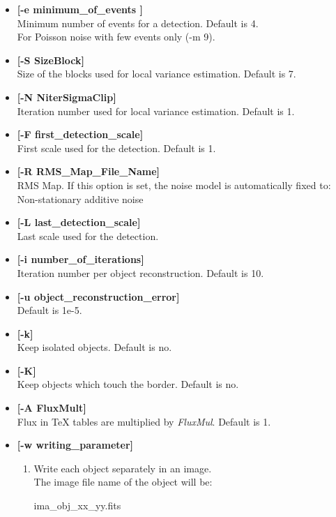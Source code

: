 \begin{itemize}
Epsilon = precision for computing thresholds. (Only used in the case of 
Poisson noise with few events). Default is 1e-03.
\item {\bf [-e minimum\_of\_events ]} \\
Minimum number of events for a detection. Default is 4. \\
For Poisson noise with few events only (-m 9).
\item {\bf [-S SizeBlock]} \\
Size of the  blocks used for local variance estimation. Default is 7.
\item {\bf [-N NiterSigmaClip]} \\
Iteration number used for local variance estimation. Default is 1.
\item {\bf [-F first\_detection\_scale]} \\
First scale used for the detection. Default is 1.
\item {\bf [-R RMS\_Map\_File\_Name]} \\
RMS Map.  If this option is set, the noise model is automatically fixed to:\\
Non-stationary additive noise
\item {\bf [-L last\_detection\_scale]} \\
Last scale used for the detection.
\item {\bf [-i number\_of\_iterations]} \\
Iteration number per object reconstruction. Default is 10.
\item {\bf [-u object\_reconstruction\_error]} \\
Default is 1e-5.
\item {\bf [-k]} \\
Keep isolated objects. Default is no.
\item {\bf [-K]} \\
Keep objects which touch the border. Default is no.
\item {\bf [-A FluxMult]} \\
 Flux in TeX tables are multiplied by {\em FluxMul}. Default is 1.   
\item {\bf [-w writing\_parameter]}
\begin{enumerate}
\baselineskip=0.4truecm
\itemsep=0.1truecm
\item  Write each object separately in an image. \\
The image file name of the object will be:
\begin{center}
                      ima\_obj\_xx\_yy.fits 

\end{center}
\end{enumerate}
\end{itemize}
